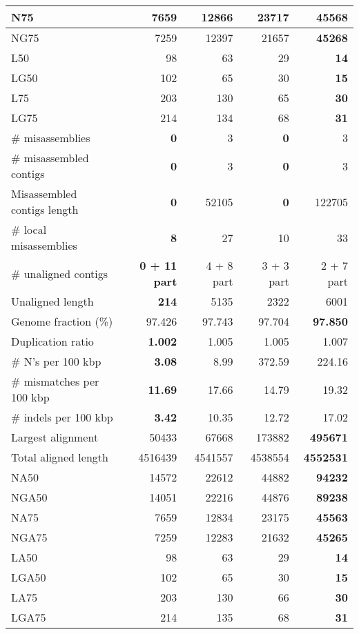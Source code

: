 \documentclass[12pt,a4paper]{article}
\begin{document}
\begin{table}[ht]
\begin{center}
\begin{tabular}{|l*{4}{|r}|}
N75 & 7659 & 12866 & 23717 & {\bf 45568} \\ \hline
NG75 & 7259 & 12397 & 21657 & {\bf 45268} \\ \hline
L50 & 98 & 63 & 29 & {\bf 14} \\ \hline
LG50 & 102 & 65 & 30 & {\bf 15} \\ \hline
L75 & 203 & 130 & 65 & {\bf 30} \\ \hline
LG75 & 214 & 134 & 68 & {\bf 31} \\ \hline
\# misassemblies & {\bf 0} & 3 & {\bf 0} & 3 \\ \hline
\# misassembled contigs & {\bf 0} & 3 & {\bf 0} & 3 \\ \hline
Misassembled contigs length & {\bf 0} & 52105 & {\bf 0} & 122705 \\ \hline
\# local misassemblies & {\bf 8} & 27 & 10 & 33 \\ \hline
\# unaligned contigs & {\bf 0 + 11 part} & 4 + 8 part & 3 + 3 part & 2 + 7 part \\ \hline
Unaligned length & {\bf 214} & 5135 & 2322 & 6001 \\ \hline
Genome fraction (\%) & 97.426 & 97.743 & 97.704 & {\bf 97.850} \\ \hline
Duplication ratio & {\bf 1.002} & 1.005 & 1.005 & 1.007 \\ \hline
\# N's per 100 kbp & {\bf 3.08} & 8.99 & 372.59 & 224.16 \\ \hline
\# mismatches per 100 kbp & {\bf 11.69} & 17.66 & 14.79 & 19.32 \\ \hline
\# indels per 100 kbp & {\bf 3.42} & 10.35 & 12.72 & 17.02 \\ \hline
Largest alignment & 50433 & 67668 & 173882 & {\bf 495671} \\ \hline
Total aligned length & 4516439 & 4541557 & 4538554 & {\bf 4552531} \\ \hline
NA50 & 14572 & 22612 & 44882 & {\bf 94232} \\ \hline
NGA50 & 14051 & 22216 & 44876 & {\bf 89238} \\ \hline
NA75 & 7659 & 12834 & 23175 & {\bf 45563} \\ \hline
NGA75 & 7259 & 12283 & 21632 & {\bf 45265} \\ \hline
LA50 & 98 & 63 & 29 & {\bf 14} \\ \hline
LGA50 & 102 & 65 & 30 & {\bf 15} \\ \hline
LA75 & 203 & 130 & 66 & {\bf 30} \\ \hline
LGA75 & 214 & 135 & 68 & {\bf 31} \\ \hline
\end{tabular}
\end{center}
\end{table}
\end{document}
